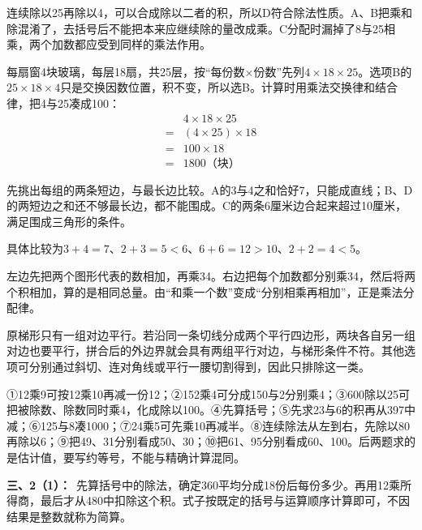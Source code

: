\documentclass[multi=snippet,border=0pt]{standalone}
\newenvironment{snippet}[3]{\begin{minipage}{#1bp}\color{answerred}\fontsize{#2}{#3}\selectfont\raggedright}{\end{minipage}}
\begin{document}
\begin{snippet}{505}{11.5}{14}连续除以25再除以4，可以合成除以二者的积，所以D符合除法性质。A、B把乘和除混淆了，去括号后不能把本来应继续除的量改成乘。C分配时漏掉了8与25相乘，两个加数都应受到同样的乘法作用。\end{snippet}
\begin{snippet}{505}{11.5}{14}每扇窗4块玻璃，每层18扇，共25层，按“每份数\(\times\)份数”先列\(4\times18\times25\)。选项B的\(25\times18\times4\)只是交换因数位置，积不变，所以选B。计算时用乘法交换律和结合律，把4与25凑成100：\[\begin{aligned}&4\times18\times25\\={}&(4\times25)\times18\\={}&100\times18\\={}&1800\text{（块）}\end{aligned}\]\end{snippet}
\begin{snippet}{505}{11.5}{14}先挑出每组的两条短边，与最长边比较。A的3与4之和恰好7，只能成直线；B、D的两短边之和还不够最长边，都不能围成。C的两条6厘米边合起来超过10厘米，满足围成三角形的条件。\par 具体比较为\(3+4=7\)、\(2+3=5<6\)、\(6+6=12>10\)、\(2+2=4<5\)。\end{snippet}
\begin{snippet}{505}{11.5}{14}左边先把两个图形代表的数相加，再乘34。右边把每个加数都分别乘34，然后将两个积相加，算的是相同总量。由“和乘一个数”变成“分别相乘再相加”，正是乘法分配律。\end{snippet}
\begin{snippet}{505}{11.5}{14}原梯形只有一组对边平行。若沿同一条切线分成两个平行四边形，两块各自另一组对边也要平行，拼合后的外边界就会具有两组平行对边，与梯形条件不符。其他选项可分别通过斜切、连对角线或平行一腰切割得到，因此只排除这一类。\end{snippet}
\begin{snippet}{505}{11.5}{14}①12乘9可按12乘10再减一份12；②152乘4可分成150与2分别乘4；③600除以25可把被除数、除数同时乘4，化成除以100。④先算括号；⑤先求23与6的积再从397中减；⑥125与8凑1000；⑦24乘5可先乘10再减半。⑧连续除法从左到右，先除以80再除以6；⑨把49、31分别看成50、30；⑩把61、95分别看成60、100。后两题求的是估计值，要写约等号，不能与精确计算混同。\end{snippet}
\begin{snippet}{505}{11.5}{14}\textbf{三、2（1）：}\ 先算括号中的除法，确定360平均分成18份后每份多少。再用12乘所得商，最后才从480中扣除这个积。式子按既定的括号与运算顺序计算即可，不因结果是整数就称为简算。\end{snippet}
\end{document}
